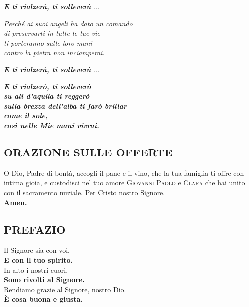 \documentclass[10pt,b6paper,usenames,twoside]{article}
\begin{document}
\hfill\begin{minipage}{\dimexpr\textwidth-1cm}
\textbf{\textit{E ti rialzerà, ti solleverà $\hdots$}}\\
\end{minipage}

\noindent \textit{Perché ai suoi angeli ha dato un comando\\
di preservarti in tutte le tue vie\\
ti porteranno sulle loro mani\\
contro la pietra non inciamperai.}
\clearpage

\hfill\begin{minipage}{\dimexpr\textwidth-1cm}
\textbf{\textit{E ti rialzerà, ti solleverà $\hdots$}}\\
\end{minipage}

\hfill\begin{minipage}{\dimexpr\textwidth-1cm}
\textbf{\textit{E ti rialzerò, ti solleverò\\
su ali d'aquila ti reggerò\\
sulla brezza dell'alba ti farò brillar\\
come il sole,\\
così nelle Mie mani vivrai.}}\\
\end{minipage}


\subsection*{\textcolor{forestgreen(traditional)}{ORAZIONE SULLE OFFERTE}} 
\noindent O Dio, Padre di bontà, accogli il pane e il vino, che la tua famiglia ti offre con intima gioia, e custodisci nel tuo amore \textcolor{forestgreen(traditional)}{\textsc{Giovanni Paolo}} e \textcolor{forestgreen(traditional)}{\textsc{Clara}} che hai unito con il sacramento nuziale. Per Cristo nostro Signore.\\ 
\textbf{Amen.} 
\subsection*{\textcolor{forestgreen(traditional)}{PREFAZIO}} 
\noindent Il Signore sia con voi.\\ 
\textbf{E con il tuo spirito.}\smallskip 
\\ 
In alto i nostri cuori.\\ 
\textbf{Sono rivolti al Signore.}\smallskip 
\\ 
Rendiamo grazie al Signore, nostro Dio.\\ 
\textbf{\`{E} cosa buona e giusta.}\\ 
\end{document}
